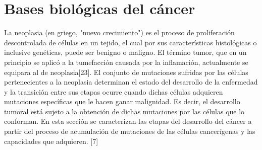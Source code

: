 \chapter{Bases biol\'ogicas del c\'ancer}\label{chapter:proposal}

\hspace{.1cm}La neoplasia (en griego, "nuevo crecimiento") es el proceso de proliferación descontrolada de células en un tejido, el cual por sus características histológicas o inclusive genéticas, puede ser benigno o maligno. El término tumor, que en un principio se aplicó a la tumefacción causada por la inflamación, actualmente se equipara al de neoplasia[23]. El conjunto de mutaciones sufridas por las células pertenecientes a la neoplasia determinan el estado del desarrollo de la enfermedad y la transición entre sus etapas ocurre cuando dichas células adquieren mutaciones específicas que le hacen ganar malignidad. Es decir, el desarrollo tumoral está sujeto a la obtención de dichas mutaciones por las células que lo conforman. En esta sección se caracterizan las etapas del desarrollo del cáncer a partir del proceso de acumulación de mutaciones de las células cancerígenas y las capacidades que adquieren. [7]

